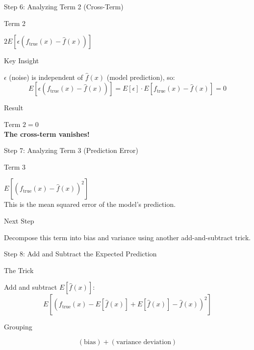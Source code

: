 \documentclass[10pt]{beamer}
\begin{document}

\begin{frame}{Step 6: Analyzing Term 2 (Cross-Term)}
\small
\begin{definitionbox}{Term 2}
\raggedright
$2E[\epsilon(f_{\text{true}}(x) - \hat{f}(x))]$
\end{definitionbox}

\begin{keypointsbox}{Key Insight}
\raggedright
$\epsilon$ (noise) is independent of $\hat{f}(x)$ (model prediction), so:
$$E[\epsilon(f_{\text{true}}(x) - \hat{f}(x))] = E[\epsilon] \cdot E[f_{\text{true}}(x) - \hat{f}(x)] = 0$$
\end{keypointsbox}

\begin{alertbox}{Result}
\raggedright
$\boxed{\text{Term 2} = 0}$\\
\textbf{The cross-term vanishes!}
\end{alertbox}
\end{frame}

\begin{frame}{Step 7: Analyzing Term 3 (Prediction Error)}
\small
\begin{definitionbox}{Term 3}
\raggedright
$E[(f_{\text{true}}(x) - \hat{f}(x))^2]$\\
This is the mean squared error of the model's prediction.
\end{definitionbox}

\begin{keypointsbox}{Next Step}
\raggedright
Decompose this term into bias and variance using another add-and-subtract trick.
\end{keypointsbox}
\end{frame}

\begin{frame}{Step 8: Add and Subtract the Expected Prediction}
\small
\begin{examplebox}{The Trick}
\raggedright
Add and subtract $E[\hat{f}(x)]$:
$$E[(f_{\text{true}}(x) - E[\hat{f}(x)] + E[\hat{f}(x)] - \hat{f}(x))^2]$$
\end{examplebox}

\begin{keypointsbox}{Grouping}
\raggedright
$$(\text{bias}) + (\text{variance deviation})$$
\end{keypointsbox}
\end{frame}
\end{document}

